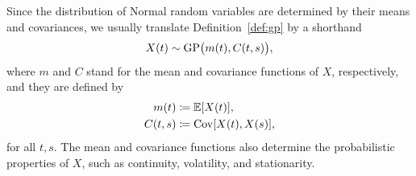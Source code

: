 \documentclass[]{article}
\begin{document}
Since the distribution of Normal random variables are determined by their means and covariances, we usually translate Definition~\ref{def:gp} by a shorthand~\citep[commonly seen in the statistical machine learning community, see, e.g.,][]{Rasmussen2006}
%
\begin{equation}
	X(t) \sim \mathrm{GP}\bigl(m(t), C(t, s)\bigr),
	\label{equ:gp-notation}
\end{equation}
%
where $m$ and $C$ stand for the mean and covariance functions of $X$, respectively, and they are defined by
%
\begin{equation*}
	\begin{split}
		m(t) &\coloneqq \expec{X(t)}, \\
		C(t, s) &\coloneqq \cov{X(t), X(s)},
	\end{split}
\end{equation*}
for all $t, s$. The mean and covariance functions also determine the probabilistic properties of $X$, such as continuity, volatility, and stationarity.
\end{document}
